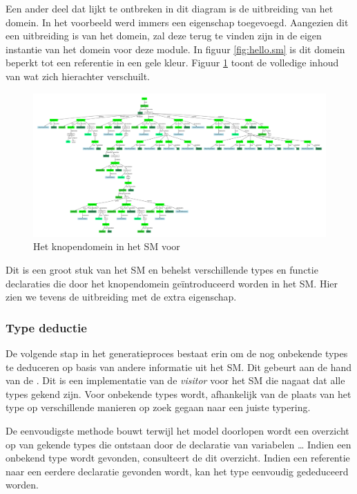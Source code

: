 Een ander deel dat lijkt te ontbreken in dit diagram is de uitbreiding van het
domein. In het voorbeeld werd immers een eigenschap  toegevoegd.
Aangezien dit een uitbreiding is van het domein, zal deze terug te vinden zijn
in de eigen instantie van het domein voor deze module. In figuur
\ref{fig:hello.sm} is dit domein beperkt tot een referentie in een gele kleur.
Figuur \ref{fig:nodes.sm} toont de volledige inhoud van wat zich hierachter
verschuilt.

\begin{figure}[H]
  \centering
  \includegraphics[angle=90,width=0.7\linewidth]{resources/nodes_sm.pdf}
  \caption{Het knopendomein in het SM voor  }
  \label{fig:nodes.sm}
\end{figure}

Dit is een groot stuk van het SM en behelst verschillende types en functie
declaraties die door het knopendomein ge\"introduceerd worden in het SM. Hier
zien we tevens de uitbreiding met de extra  eigenschap.

\subsubsection{Type deductie}

De volgende stap in het generatieproces bestaat erin om de nog onbekende types
te deduceren op basis van andere informatie uit het SM. Dit gebeurt aan de hand
van de . Dit is een implementatie van de \emph{visitor}
voor het SM die nagaat dat alle types gekend zijn. Voor onbekende types wordt,
afhankelijk van de plaats van het type op verschillende manieren op zoek gegaan
naar een juiste typering.

De eenvoudigste methode bouwt terwijl het model doorlopen wordt een overzicht
op van gekende types die ontstaan door de declaratie van variabelen \dots
Indien een onbekend type wordt gevonden, consulteert de 
dit overzicht. Indien een referentie naar een eerdere declaratie gevonden
wordt, kan het type eenvoudig gededuceerd worden.


